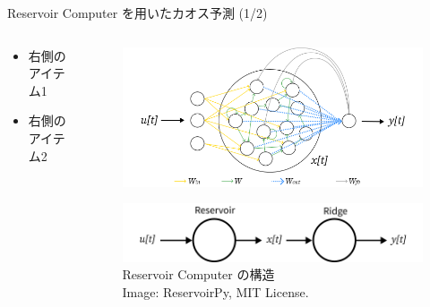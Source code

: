 \begin{frame}{Reservoir Computer を用いたカオス予測 (1/2)}
    \begin{columns}[T] %
  
      \begin{column}{.5\textwidth}
        
        \begin{itemize}
          \item 右側のアイテム1
          \item 右側のアイテム2
        \end{itemize}
      \end{column}

      \begin{column}{.5\textwidth}
        \begin{figure}
            \includegraphics[width=\textwidth]{Fig/esn.svg.png}
        \end{figure}  
        \begin{figure}
            \includegraphics[width=\textwidth]{Fig/esn_nodes.svg.png}
            \caption{\scriptsize{Reservoir Computer の構造}\\ \tiny{Image: ReservoirPy, MIT License.}}
        \end{figure}  
      \end{column}
    \end{columns}
  \end{frame}

